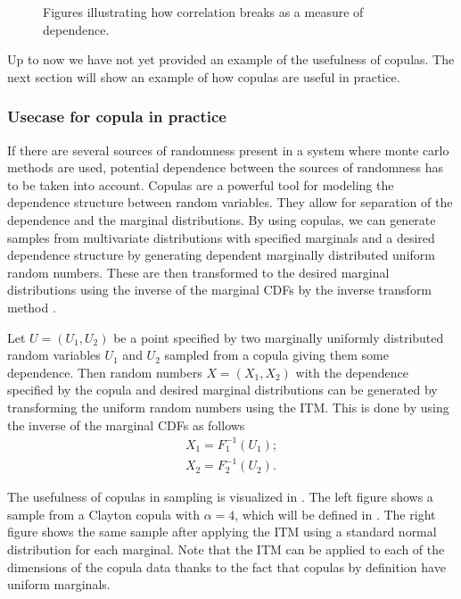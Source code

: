 \begin{figure}
\begin{minipage}{0.45\textwidth}
        \label{fig:exponentialDependenceScatterRet}
    \end{minipage}
    \caption{Figures illustrating how correlation breaks as a measure of dependence.}
    \label{fig:ExamplePlots}
\end{figure}

Up to now we have not yet provided an example of the usefulness of copulas. The next section will show an example of how copulas are useful in practice.

\subsubsection{Usecase for copula in practice}\label{sec:CopulaUseCase}
If there are several sources of randomness present in a system where monte carlo methods are used, potential dependence between the sources of randomness has to be taken into account. Copulas are a powerful tool for modeling the dependence structure between random variables. They allow for separation of the dependence and the marginal distributions. By using copulas, we can generate samples from multivariate distributions with specified marginals and a desired dependence structure by generating dependent marginally distributed uniform random numbers. These are then transformed to the desired marginal distributions using the inverse of the marginal \gls{CDF}s by the inverse transform method .

Let $U = (U_1,U_2)$ be a point specified by two marginally uniformly distributed random variables $U_1$ and $U_2$ sampled from a copula giving them some dependence. Then random numbers $X = (X_1,X_2)$ with the dependence specified by the copula and desired marginal distributions can be generated by transforming the uniform random numbers using the \gls{ITM}. This is done by using the inverse of the marginal \gls{CDF}s as follows
\begin{align*}
    X_1 = F_1^{-1}(U_1); \\
    X_2 = F_2^{-1}(U_2).
\end{align*}

The usefulness of copulas in sampling is visualized in . The left figure shows a sample from a Clayton copula with $\alpha = 4$, which will be defined in . The right figure shows the same sample after applying the \gls{ITM} using a standard normal distribution for each marginal. Note that the \gls{ITM} can be applied to each of the dimensions of the copula data thanks to the fact that copulas by definition have uniform marginals. 

